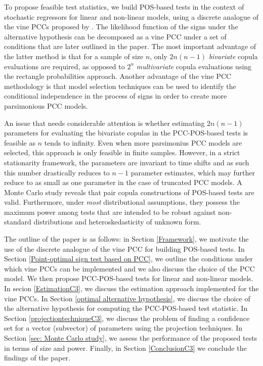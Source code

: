 \documentclass[harvard,11pt]{article}
\begin{document}
To propose feasible test statistics, we build POS-based tests in the context of stochastic regressors for linear and non-linear models, using a discrete analogue of the vine PCCs proposed by \citet{panagiotelis2012pair}. The likelihood function of the signs under the alternative hypothesis can be decomposed as a vine PCC under a set of conditions that are later outlined in the paper. The most important advantage of the latter method is that for a sample of size $n$, only $2n(n-1)$ \textit{bivariate} copula evaluations are required, as opposed to $2^n$ \textit{multivariate} copula evaluations using the rectangle probabilities approach. Another advantage of the vine PCC methodology is that model selection techniques can be used to identify the conditional independence in the process of signs in order to create more parsimonious PCC models. 


 An issue that needs considerable attention is whether estimating $2n(n-1)$ parameters for evaluating the bivariate copulas in the PCC-POS-based tests is feasible as $n$ tends to infinity. Even when more parsimonius PCC models are selected, this approach is only feasible in finite samples. However, in a strict stationarity framework, the parameters are invariant to time shifts and as such this number drastically reduces to $n-1$ parameter estimates, which may further reduce to as small as one parameter in the case of truncated PCC models. A Monte Carlo study reveals that pair copula constructions of POS-based tests are valid. Furthermore, under \textit{most} distributional assumptions, they possess the maximum power among tests that are intended to be robust against non-standard distributions and heteroskedasticity of unknown form.  

The outline of the paper is as follows: in Section \ref{Framework}, we motivate the use of the discrete analogue of the vine PCC for building POS-based tests. In Section \ref{Point-optimal sign
test based on PCC}, we outline the conditions under which vine PCCs can be implemented and we also discuss the choice of the PCC model. We then propose PCC-POS-based tests for linear and non-linear models. In secion \ref{EstimationC3}, we discuss the estimation approach implemented for the vine PCCs. In Section \ref{optimal alternative hypothesis}, we discuss the choice of the alternative hypothesis for computing the PCC-POS-based test statistic. In Section \ref{projectiontechniqueC3}, we discuss the problem of finding a confidence set for a vector (subvector) of parameters using the projection techniques. In Section \ref{sec: Monte Carlo study}, we assess the performance of the proposed tests in terms of size and power. Finally, in Section \ref{ConclusionC3} we conclude the findings of the paper.
\end{document}
